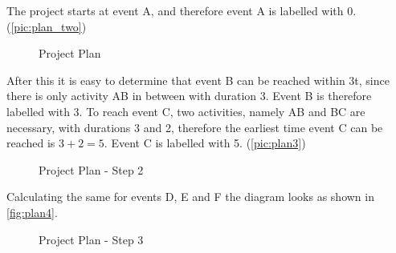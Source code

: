 The project starts at event A, and therefore event A is labelled with 0. (\autoref{pic:plan_two})
\begin{figure}[h] 
\centerline{}
\caption{Project Plan}
\label{pic:plan_two}
\end{figure}
After this it is easy to determine that event B can be reached within 3t, since there is only activity AB in between with duration 3. Event B is therefore labelled with 3.
To reach event C, two activities, namely AB and BC are necessary, with durations 3 and 2, therefore the earliest time event C can be reached is $3+2 = 5$. Event C is labelled with 5. (\autoref{pic:plan3})
\begin{figure}[h] 
\centerline{}
\caption{Project Plan - Step 2}
\label{pic:plan3}
\end{figure}

Calculating the same for events D, E and F the diagram looks as shown in \autoref{fig:plan4}.
\begin{figure}[h] 
\centerline{}
\caption{Project Plan - Step 3}
\label{fig:plan4}
\end{figure}

